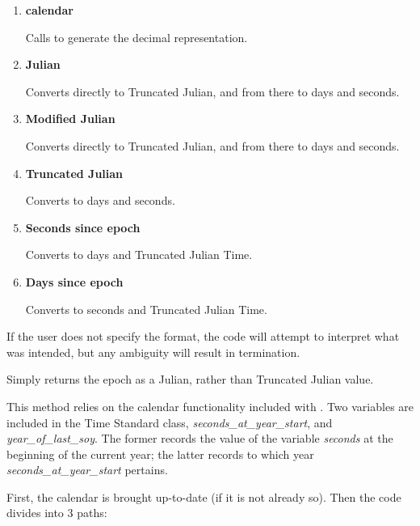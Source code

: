 {\begin{enumerate}
{\begin{enumerate}
\begin{enumerate}
\item {\bfseries
calendar}

Calls  to generate
the decimal
representation.
\item {\bfseries
Julian}

Converts directly to Truncated Julian, and from there to days and
seconds.
\item {\bfseries
Modified Julian}

Converts directly to Truncated Julian, and from there to days and
seconds.
\item {\bfseries
Truncated Julian}

Converts to days and seconds.
\item {\bfseries
Seconds since epoch}

Converts to days and Truncated Julian Time.
\item {\bfseries
Days since epoch}

Converts to seconds and Truncated Julian Time.
\end{enumerate}



If the user does not specify the format, the code will attempt to
interpret what was intended, but any ambiguity will result in
termination.

Simply returns the epoch as a Julian, rather than Truncated Julian
value.

This method relies on the calendar functionality included with \JEODid.  Two
variables are included in the Time Standard class,
\textit{seconds\_at\_year\_start}, and \textit{year\_of\_last\_soy}.  The
former records the value of the variable \textit{seconds} at the beginning of
the current year; the latter records to which year
\textit{seconds\_at\_year\_start} pertains.

First, the calendar is brought up-to-date (if it is not already so).  Then the
code divides into 3 paths:


\end{enumerate}}
\end{enumerate}}
